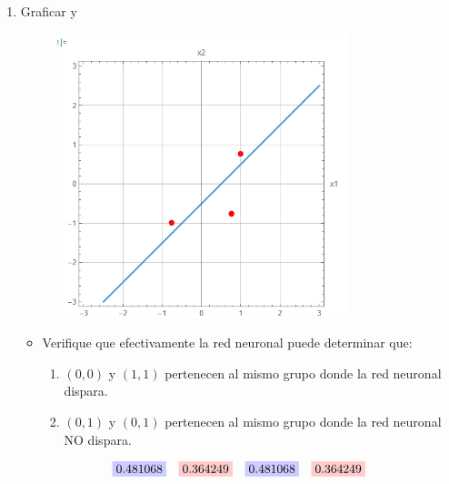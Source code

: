 \documentclass{article}
\begin{document}
\begin{flushleft}
\begin{enumerate}
\item Graficar y 
\begin{figure}[H]
  \centering
  \includegraphics[width=0.8\textwidth]{4_h_tan.PNG}  %
\end{figure}

\begin{itemize}
  \item Verifique que efectivamente la red neuronal puede determinar que:
  \begin{enumerate}
    \item $(0,0)$ y $(1,1)$ pertenecen al mismo grupo donde la red neuronal dispara.
    \item $(0,1)$ y $(0,1)$ pertenecen al mismo grupo donde la red neuronal NO dispara.
  \end{enumerate}
\end{itemize}

\[
\begin{array}{cccc}
\colorbox{blue!20}{0.481068} & \colorbox{red!20}{0.364249} & \colorbox{blue!20}{0.481068} & \colorbox{red!20}{0.364249}
\end{array}
\]
  \end{enumerate}
\end{flushleft}
\end{document}
